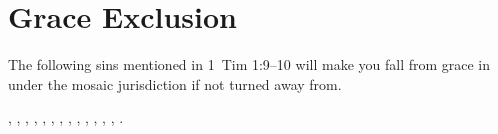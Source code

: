 \section{Grace Exclusion}

The following sins mentioned in 1~Tim 1:9--10 will make you fall from grace in under the mosaic jurisdiction if not turned away from.

, 
, 
, 
, 
, 
, 
, 
, 
,
, 
, 
, 
, 
.
